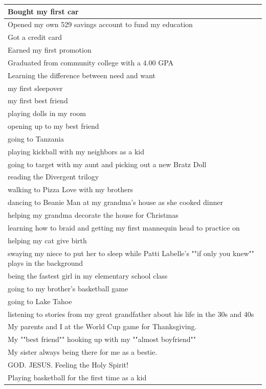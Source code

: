 \documentclass[
  .7em,
  letterpaper,
  DIV=11,
  numbers=noendperiod]{scrartcl}
\begin{document}
\begin{table}
\begin{tabular}{l}
\hline
Bought my first car\\
\hline
Opened my own 529 savings account to fund my education\\
\hline
Got a credit card\\
\hline
Earned my first promotion\\
\hline
Graduated from community college with a 4.00 GPA\\
\hline
Learning the difference between need and want\\
\hline
my first sleepover\\
\hline
my first best friend\\
\hline
playing dolls in my room\\
\hline
opening up to my best friend\\
\hline
going to Tanzania\\
\hline
playing kickball with my neighbors as a kid\\
\hline
going to target with my aunt and picking out a new Bratz Doll\\
\hline
reading the Divergent trilogy\\
\hline
walking to Pizza Love with my brothers\\
\hline
dancing to Beanie Man at my grandma's house as she cooked dinner\\
\hline
helping my grandma decorate the house for Christmas\\
\hline
learning how to braid and getting my first mannequin head to practice on\\
\hline
helping my cat give birth\\
\hline
swaying my niece to put her to sleep while Patti Labelle's ""if only you knew"" plays in the background\\
\hline
being the fastest girl in my elementary school class\\
\hline
going to my brother's basketball game\\
\hline
going to Lake Tahoe\\
\hline
listening to stories from my great grandfather about his life in the 30s and 40s\\
\hline
My parents and I at the World Cup game for Thanksgiving.\\
\hline
My ""best friend"" hooking up with my ""almost boyfriend""\\
\hline
My sister always being there for me as a bestie.\\
\hline
GOD. JESUS. Feeling the Holy Spirit!\\
\hline
Playing basketball for the first time as a kid\\

\end{tabular}
\end{table}
\end{document}
